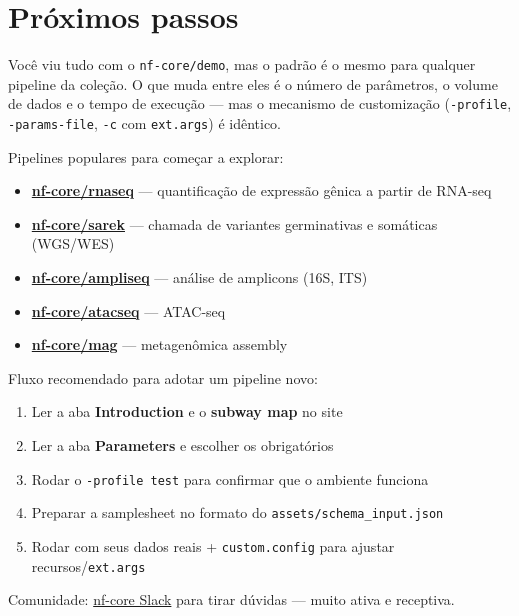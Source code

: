 \documentclass[
  brazilian,
  letterpaper,
  DIV=11,
  numbers=noendperiod]{scrreprt}
\providecommand{\tightlist}{%
  \setlength{\itemsep}{0pt}\setlength{\parskip}{0pt}}
\begin{document}
\chapter{Próximos passos}\label{pruxf3ximos-passos}

Você viu tudo com o \texttt{nf-core/demo}, mas o padrão é o mesmo para
qualquer pipeline da coleção. O que muda entre eles é o número de
parâmetros, o volume de dados e o tempo de execução --- mas o mecanismo
de customização (\texttt{-profile}, \texttt{-params-file}, \texttt{-c}
com \texttt{ext.args}) é idêntico.

Pipelines populares para começar a explorar:

\begin{itemize}
\tightlist
\item
  \textbf{\href{https://nf-co.re/rnaseq}{nf-core/rnaseq}} ---
  quantificação de expressão gênica a partir de RNA-seq
\item
  \textbf{\href{https://nf-co.re/sarek}{nf-core/sarek}} --- chamada de
  variantes germinativas e somáticas (WGS/WES)
\item
  \textbf{\href{https://nf-co.re/ampliseq}{nf-core/ampliseq}} ---
  análise de amplicons (16S, ITS)
\item
  \textbf{\href{https://nf-co.re/atacseq}{nf-core/atacseq}} --- ATAC-seq
\item
  \textbf{\href{https://nf-co.re/mag}{nf-core/mag}} --- metagenômica
  assembly
\end{itemize}

Fluxo recomendado para adotar um pipeline novo:

\begin{enumerate}
\def\labelenumi{\arabic{enumi}.}
\tightlist
\item
  Ler a aba \textbf{Introduction} e o \textbf{subway map} no site
\item
  Ler a aba \textbf{Parameters} e escolher os obrigatórios
\item
  Rodar o \texttt{-profile\ test} para confirmar que o ambiente funciona
\item
  Preparar a samplesheet no formato do
  \texttt{assets/schema\_input.json}
\item
  Rodar com seus dados reais + \texttt{custom.config} para ajustar
  recursos/\texttt{ext.args}
\end{enumerate}

Comunidade: \href{https://nf-co.re/join/slack}{nf-core Slack} para tirar
dúvidas --- muito ativa e receptiva.
\end{document}
